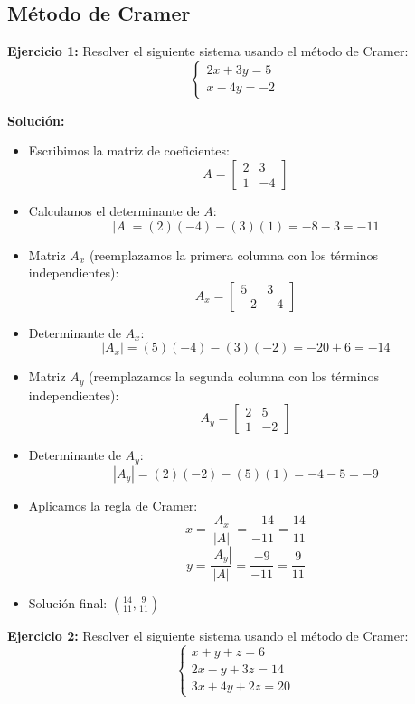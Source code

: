 \documentclass{profesor}
\begin{document}
\newpage
\subsection{Método de Cramer}

\textbf{Ejercicio 1:}  
Resolver el siguiente sistema usando el método de Cramer:  
\[
\begin{cases}
2x + 3y = 5 \\
x - 4y = -2
\end{cases}
\]

\textbf{Solución:}  
\begin{itemize}
    \item Escribimos la matriz de coeficientes:
    \[
    A =
    \begin{bmatrix}
    2 & 3 \\
    1 & -4
    \end{bmatrix}
    \]
    \item Calculamos el determinante de \( A \):
    \[
    |A| = (2)(-4) - (3)(1) = -8 - 3 = -11
    \]
    \item Matriz \( A_x \) (reemplazamos la primera columna con los términos independientes):
    \[
    A_x =
    \begin{bmatrix}
    5 & 3 \\
    -2 & -4
    \end{bmatrix}
    \]
    \item Determinante de \( A_x \):
    \[
    |A_x| = (5)(-4) - (3)(-2) = -20 + 6 = -14
    \]
    \item Matriz \( A_y \) (reemplazamos la segunda columna con los términos independientes):
    \[
    A_y =
    \begin{bmatrix}
    2 & 5 \\
    1 & -2
    \end{bmatrix}
    \]
    \item Determinante de \( A_y \):
    \[
    |A_y| = (2)(-2) - (5)(1) = -4 - 5 = -9
    \]
    \item Aplicamos la regla de Cramer:
    \[
    x = \frac{|A_x|}{|A|} = \frac{-14}{-11} = \frac{14}{11}
    \]
    \[
    y = \frac{|A_y|}{|A|} = \frac{-9}{-11} = \frac{9}{11}
    \]
    \item Solución final: \( \left(\frac{14}{11}, \frac{9}{11}\right) \)
\end{itemize}

\textbf{Ejercicio 2:}  
Resolver el siguiente sistema usando el método de Cramer:  
\[
\begin{cases}
x + y + z = 6 \\
2x - y + 3z = 14 \\
3x + 4y + 2z = 20
\end{cases}
\]
\end{document}
